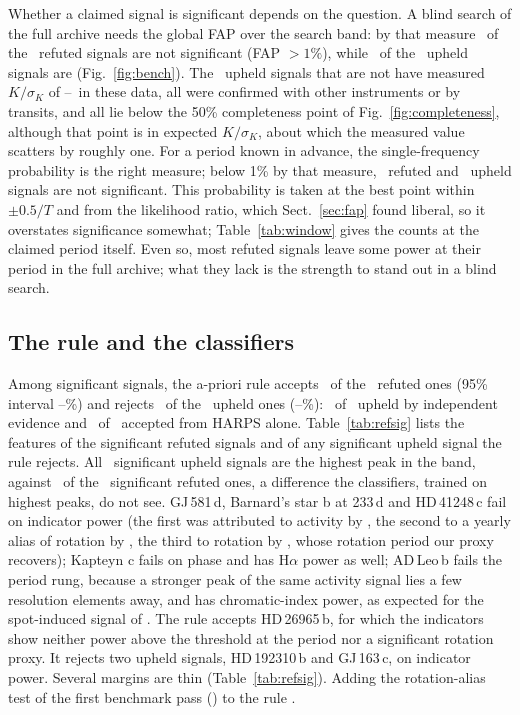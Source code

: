 Whether a claimed signal is significant depends on the question. A blind search of
the full archive needs the global FAP over the search band: by that measure
\nmRefNotDet\ of the \nmBenchR\ refuted signals are not significant (FAP $> 1\%$), while
\nmUpDet\ of the \nmUpN\ upheld signals are (Fig.~\ref{fig:bench}). The \nmUpNotDet\
upheld signals that are not have measured $K/\sigma_K$ of
\nmUpNotDetSnrLo--\nmUpNotDetSnrHi\ in these data, all were confirmed with other
instruments or by transits, and all lie below the 50\% completeness point of
Fig.~\ref{fig:completeness}, although that point is in expected $K/\sigma_K$, about which
the measured value scatters by roughly one. For a period known in advance,
the single-frequency probability is the right measure; below 1\% by that measure,
\nmRefNotDetSingle\ refuted and \nmUpNotDetSingle\ upheld signals are not significant.
This probability is taken at the best point within $\pm0.5/T$ and from the likelihood
ratio, which Sect.~\ref{sec:fap} found liberal, so it overstates significance somewhat;
Table~\ref{tab:window} gives the counts at the claimed period itself. Even so, most
refuted signals leave some power at their period in the full archive; what they lack is
the strength to stand out in a blind search.

\subsection{The rule and the classifiers}

Among significant signals, the a-priori rule accepts \nmBRuleRefAcc\ of the
\nmBRuleRefN\ refuted ones (95\% interval \nmBRuleFPRLo--\nmBRuleFPRHi\%) and rejects
\nmBRuleUpRej\ of the \nmBRuleUpN\ upheld ones (\nmBRuleFNRLo--\nmBRuleFNRHi\%):
\nmBRuleUIRej\ of \nmBRuleUIN\ upheld by independent evidence and \nmBRuleUHRej\ of
\nmBRuleUHN\ accepted from HARPS alone. Table~\ref{tab:refsig} lists the features of the
significant refuted signals and of any significant upheld signal the rule rejects. All
\nmTopUp\ significant upheld signals are the highest peak in the band, against
\nmTopRef\ of the \nmBRuleRefN\ significant refuted ones, a difference the classifiers,
trained on highest peaks, do not see.
GJ\,581\,d, Barnard's star b at 233\,d and HD\,41248\,c fail on indicator power (the first
was attributed to activity by \citealt{Robertson2014}, the second to a yearly alias of
rotation by \citealt{Lubin2021}, the third to rotation by \citealt{Santos2014}, whose
rotation period our proxy recovers); Kapteyn c fails on phase and has H$\alpha$ power as
well; AD\,Leo\,b fails the period rung, because a stronger peak of the same activity signal
lies a few resolution elements away, and has chromatic-index power, as expected for the
spot-induced signal of \citet{Carleo2020}. The rule accepts HD\,26965\,b, for which the
indicators show neither power above the threshold at the period nor a significant rotation
proxy. It rejects two upheld signals, HD\,192310\,b and GJ\,163\,c, on indicator power.
Several margins are thin (Table~\ref{tab:refsig}). Adding the rotation-alias test of the first benchmark pass () to
the rule \nmBRuleAliasEffect.

